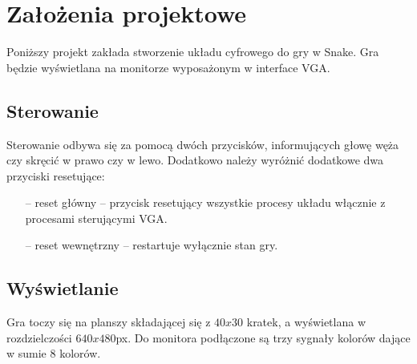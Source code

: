 \section{Założenia projektowe}
    \tab Poniższy projekt zakłada stworzenie układu cyfrowego do gry w Snake.
    Gra będzie wyświetlana na monitorze wyposażonym w interface VGA.
    \subsection{Sterowanie}
        \tab Sterowanie odbywa się za pomocą dwóch przycisków,
        informujących głowę węża czy skręcić w prawo czy w lewo.
% 
        Dodatkowo należy wyróżnić dodatkowe dwa przyciski resetujące:
        \begin{itemize}
            \item [--] reset główny -- przycisk resetujący wszystkie procesy układu włącznie z procesami sterującymi VGA.
            \item [--] reset wewnętrzny -- restartuje wyłącznie stan gry.
        \end{itemize}

    \subsection{Wyświetlanie}
        \tab Gra toczy się na planszy składającej się z $40x30$ kratek,
        a wyświetlana w rozdzielczości $640x480$px.
        Do monitora podłączone są trzy sygnały kolorów dające w sumie 8 kolorów.

